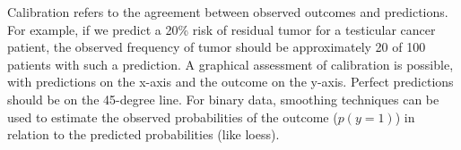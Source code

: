 \documentclass[12pt]{article}
\begin{document}
Calibration refers to the agreement between observed outcomes and predictions. For example, if we predict a 20\% risk of residual tumor for a testicular cancer patient, the observed frequency of tumor should be approximately 20 of 100 patients with such a prediction. A graphical assessment of calibration is possible, with predictions on the x-axis and the outcome on the y-axis. Perfect predictions should be on the 45-degree line. For binary data, smoothing techniques can be used to estimate the observed probabilities of the outcome ($p(y=1)$) in relation to the predicted probabilities (like loess).





\end{document}
